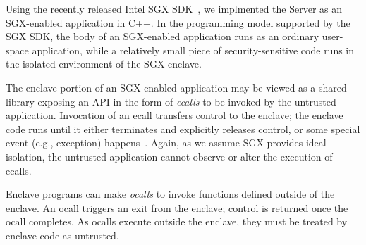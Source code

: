 

Using the recently released Intel SGX SDK~\cite{sgxsdk}, we implmented the \tc
Server as an SGX-enabled application in C++. In the programming model supported
by the SGX SDK, the body of an SGX-enabled application runs as an ordinary
user-space application, while a relatively small piece of security-sensitive
code runs in the isolated environment of the SGX enclave.

The enclave portion of an SGX-enabled application may be viewed as a shared
library exposing an API in the form of \emph{ecalls} to be invoked by the
untrusted application. Invocation of an ecall transfers control to the enclave;
the enclave code runs until it either terminates and explicitly releases
control, or some special event (e.g., exception) happens~\cite{sgxmanual}.
Again, as we assume SGX provides ideal isolation, the untrusted application
cannot observe or alter the execution of ecalls.

Enclave programs can make \emph{ocalls} to invoke functions defined outside of
the enclave. An ocall triggers an exit from the enclave; control is returned
once the ocall completes. As ocalls execute outside the enclave, they must be
treated by enclave code as untrusted. 


